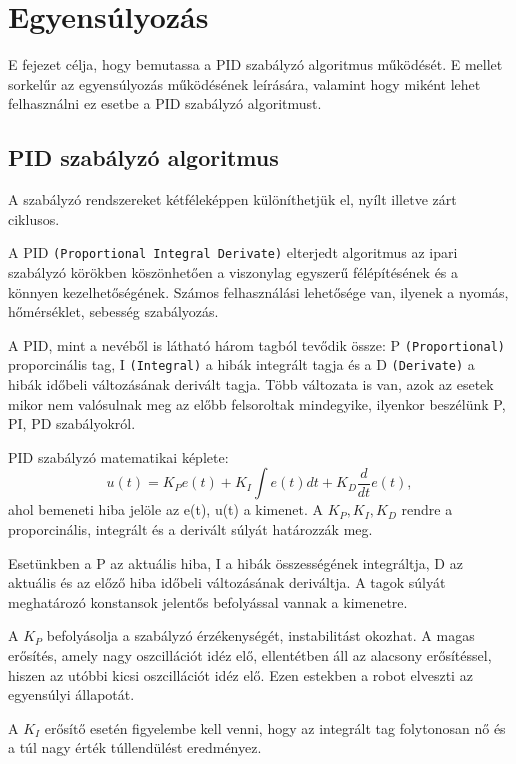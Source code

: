 \chapter{Egyensúlyozás}\label{ch:EGYENSULY}
\begin{osszefoglal}
E fejezet célja, hogy bemutassa a PID szabályzó algoritmus működését. E mellet sorkelűr az egyensúlyozás működésének leírására, valamint hogy miként lehet felhasználni ez esetbe a PID szabályzó algoritmust.
\end{osszefoglal}



\section{PID szabályzó algoritmus}\label{sec:EGYENSULY:pid}

A szabályzó rendszereket kétféleképpen különíthetjük el, nyílt illetve zárt ciklusos.

A PID \texttt{(Proportional Integral Derivate)} elterjedt algoritmus az ipari szabályzó körökben köszönhetően a viszonylag egyszerű félépítésének és a könnyen kezelhetőségének. Számos felhasználási lehetősége van, ilyenek a nyomás, hőmérséklet, sebesség szabályozás.

A PID, mint a nevéből is látható három tagból tevődik össze: P \texttt{(Proportional)} proporcinális tag, I \texttt{(Integral)} a hibák integrált tagja és a D \texttt{(Derivate)} a hibák időbeli változásának derivált tagja. Több változata is van, azok az esetek mikor nem valósulnak meg az előbb felsoroltak mindegyike, ilyenkor beszélünk P, PI, PD szabályokról.

PID szabályzó matematikai képlete: $$u(t)=K_{P}e(t)+K_{I}\int e(t)dt+K_{D}\frac{d}{dt}e(t),$$ ahol bemeneti hiba jelöle az e(t), u(t) a kimenet. A $K_{P}, K_{I}, K_{D}$ rendre a proporcinális, integrált és a derivált súlyát határozzák meg.

Esetünkben a P az aktuális hiba, I a hibák összességének integráltja, D az aktuális és az előző hiba időbeli változásának deriváltja. A tagok súlyát meghatározó konstansok jelentős befolyással vannak a kimenetre. 

A $K_{P}$ befolyásolja a szabályzó érzékenységét, instabilitást okozhat. A magas erősítés, amely nagy oszcillációt idéz elő, ellentétben áll az alacsony erősítéssel, hiszen az utóbbi kicsi oszcillációt idéz elő. Ezen estekben a robot elveszti az egyensúlyi állapotát. 

A $K_{I}$ erősítő esetén figyelembe kell venni, hogy az integrált tag folytonosan nő és a túl nagy érték túllendülést eredményez. 

